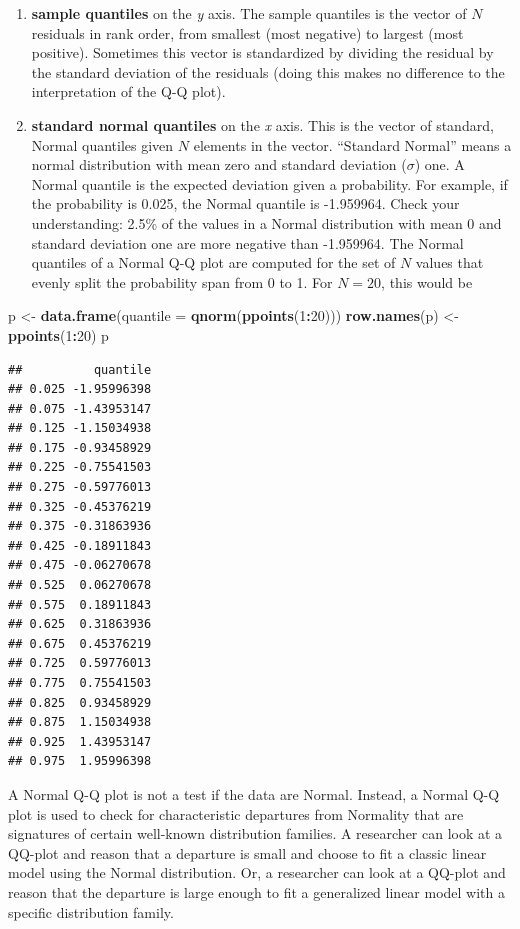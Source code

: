 \documentclass[]{book}
\newenvironment{Shaded}{\begin{snugshade}}{\end{snugshade}}
\newcommand{\DataTypeTok}[1]{\textcolor[rgb]{0.13,0.29,0.53}{#1}}
\newcommand{\DecValTok}[1]{\textcolor[rgb]{0.00,0.00,0.81}{#1}}
\newcommand{\KeywordTok}[1]{\textcolor[rgb]{0.13,0.29,0.53}{\textbf{#1}}}
\newcommand{\NormalTok}[1]{#1}
\newcommand{\OperatorTok}[1]{\textcolor[rgb]{0.81,0.36,0.00}{\textbf{#1}}}
\newcommand{\StringTok}[1]{\textcolor[rgb]{0.31,0.60,0.02}{#1}}
\providecommand{\tightlist}{%
  \setlength{\itemsep}{0pt}\setlength{\parskip}{0pt}}
\begin{document}
\begin{enumerate}
\def\labelenumi{\arabic{enumi}.}
\tightlist
\item
  \textbf{sample quantiles} on the \emph{y} axis. The sample quantiles is the vector of \(N\) residuals in rank order, from smallest (most negative) to largest (most positive). Sometimes this vector is standardized by dividing the residual by the standard deviation of the residuals (doing this makes no difference to the interpretation of the Q-Q plot).
\item
  \textbf{standard normal quantiles} on the \emph{x} axis. This is the vector of standard, Normal quantiles given \(N\) elements in the vector. ``Standard Normal'' means a normal distribution with mean zero and standard deviation (\(\sigma\)) one. A Normal quantile is the expected deviation given a probability. For example, if the probability is 0.025, the Normal quantile is -1.959964. Check your understanding: 2.5\% of the values in a Normal distribution with mean 0 and standard deviation one are more negative than -1.959964. The Normal quantiles of a Normal Q-Q plot are computed for the set of \(N\) values that evenly split the probability span from 0 to 1. For \(N=20\), this would be
\end{enumerate}

\begin{Shaded}
\begin{Highlighting}[]
\NormalTok{p <-}\StringTok{ }\KeywordTok{data.frame}\NormalTok{(}\DataTypeTok{quantile =} \KeywordTok{qnorm}\NormalTok{(}\KeywordTok{ppoints}\NormalTok{(}\DecValTok{1}\OperatorTok{:}\DecValTok{20}\NormalTok{)))}
\KeywordTok{row.names}\NormalTok{(p) <-}\StringTok{ }\KeywordTok{ppoints}\NormalTok{(}\DecValTok{1}\OperatorTok{:}\DecValTok{20}\NormalTok{)}
\NormalTok{p}
\end{Highlighting}
\end{Shaded}

\begin{verbatim}
##          quantile
## 0.025 -1.95996398
## 0.075 -1.43953147
## 0.125 -1.15034938
## 0.175 -0.93458929
## 0.225 -0.75541503
## 0.275 -0.59776013
## 0.325 -0.45376219
## 0.375 -0.31863936
## 0.425 -0.18911843
## 0.475 -0.06270678
## 0.525  0.06270678
## 0.575  0.18911843
## 0.625  0.31863936
## 0.675  0.45376219
## 0.725  0.59776013
## 0.775  0.75541503
## 0.825  0.93458929
## 0.875  1.15034938
## 0.925  1.43953147
## 0.975  1.95996398
\end{verbatim}

A Normal Q-Q plot is not a test if the data are Normal. Instead, a Normal Q-Q plot is used to check for characteristic departures from Normality that are signatures of certain well-known distribution families. A researcher can look at a QQ-plot and reason that a departure is small and choose to fit a classic linear model using the Normal distribution. Or, a researcher can look at a QQ-plot and reason that the departure is large enough to fit a generalized linear model with a specific distribution family.
\end{document}
